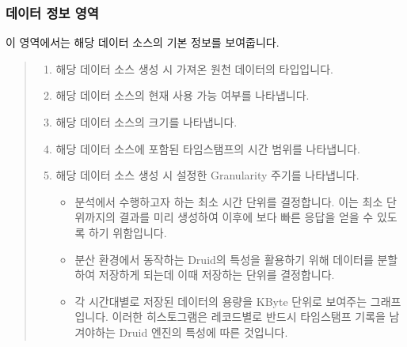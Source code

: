 \documentclass[letterpaper,10pt,english]{sphinxmanual}
\begin{document}
\subsubsection{데이터 정보 영역}
\label{\detokenize{discovery/part02/data_source_detail_view:id3}}
이 영역에서는 해당 데이터 소스의 기본 정보를 보여줍니다.
\begin{quote}

\begin{figure}[H]
\centering

\noindent{}
\end{figure}
\begin{enumerate}
\def\theenumi{\arabic{enumi}}
\def\labelenumi{\theenumi .}
\makeatletter\def\p@enumii{\p@enumi \theenumi .}\makeatother
\item {} 
 해당 데이터 소스 생성 시 가져온 원천 데이터의 타입입니다.

\item {} 
 해당 데이터 소스의 현재 사용 가능 여부를 나타냅니다.

\item {} 
 해당 데이터 소스의 크기를 나타냅니다.

\item {} 
 해당 데이터 소스에 포함된 타임스탬프의 시간 범위를 나타냅니다.

\item {} 
 해당 데이터 소스 생성 시 설정한 Granularity 주기를 나타냅니다.
\begin{itemize}
\item {} 
 분석에서 수행하고자 하는 최소 시간 단위를 결정합니다. 이는 최소 단위까지의 결과를 미리 생성하여 이후에 보다 빠른 응답을 얻을 수 있도록 하기 위함입니다.

\item {} 
 분산 환경에서 동작하는 Druid의 특성을 활용하기 위해 데이터를 분할하여 저장하게 되는데 이때 저장하는 단위를 결정합니다.

\item {} 
 각 시간대별로 저장된 데이터의 용량을 KByte 단위로 보여주는 그래프입니다. 이러한 히스토그램은 레코드별로 반드시 타임스탬프 기록을 남겨야하는 Druid 엔진의 특성에 따른 것입니다.

\end{itemize}

\end{enumerate}
\end{quote}
\end{document}
